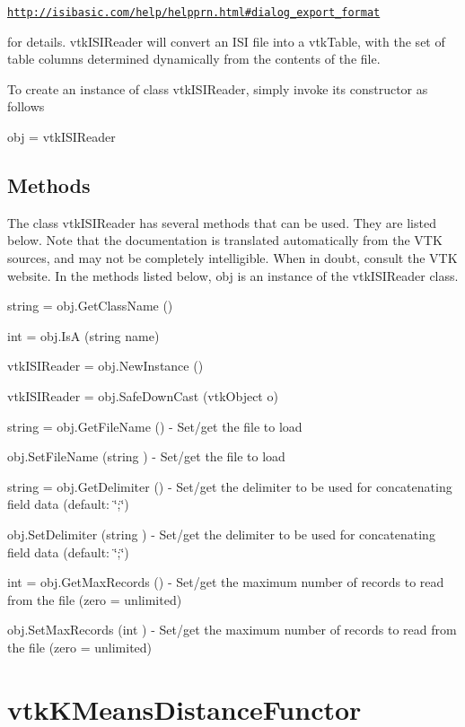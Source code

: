 \href{http://isibasic.com/help/helpprn.html#dialog_export_format}{\tt http\-://isibasic.\-com/help/helpprn.\-html\#dialog\-\_\-export\-\_\-format}

for details. vtk\-I\-S\-I\-Reader will convert an I\-S\-I file into a vtk\-Table, with the set of table columns determined dynamically from the contents of the file.

To create an instance of class vtk\-I\-S\-I\-Reader, simply invoke its constructor as follows \begin{DoxyVerb}  obj = vtkISIReader
\end{DoxyVerb}
 \hypertarget{vtkwidgets_vtkxyplotwidget_Methods}{}\subsection{Methods}\label{vtkwidgets_vtkxyplotwidget_Methods}
The class vtk\-I\-S\-I\-Reader has several methods that can be used. They are listed below. Note that the documentation is translated automatically from the V\-T\-K sources, and may not be completely intelligible. When in doubt, consult the V\-T\-K website. In the methods listed below, {\ttfamily obj} is an instance of the vtk\-I\-S\-I\-Reader class. 
\begin{DoxyItemize}
\item {\ttfamily string = obj.\-Get\-Class\-Name ()}  
\item {\ttfamily int = obj.\-Is\-A (string name)}  
\item {\ttfamily vtk\-I\-S\-I\-Reader = obj.\-New\-Instance ()}  
\item {\ttfamily vtk\-I\-S\-I\-Reader = obj.\-Safe\-Down\-Cast (vtk\-Object o)}  
\item {\ttfamily string = obj.\-Get\-File\-Name ()} -\/ Set/get the file to load  
\item {\ttfamily obj.\-Set\-File\-Name (string )} -\/ Set/get the file to load  
\item {\ttfamily string = obj.\-Get\-Delimiter ()} -\/ Set/get the delimiter to be used for concatenating field data (default\-: \char`\"{};\char`\"{})  
\item {\ttfamily obj.\-Set\-Delimiter (string )} -\/ Set/get the delimiter to be used for concatenating field data (default\-: \char`\"{};\char`\"{})  
\item {\ttfamily int = obj.\-Get\-Max\-Records ()} -\/ Set/get the maximum number of records to read from the file (zero = unlimited)  
\item {\ttfamily obj.\-Set\-Max\-Records (int )} -\/ Set/get the maximum number of records to read from the file (zero = unlimited)  
\end{DoxyItemize}\hypertarget{vtkinfovis_vtkkmeansdistancefunctor}{}\section{vtk\-K\-Means\-Distance\-Functor}\label{vtkinfovis_vtkkmeansdistancefunctor}
